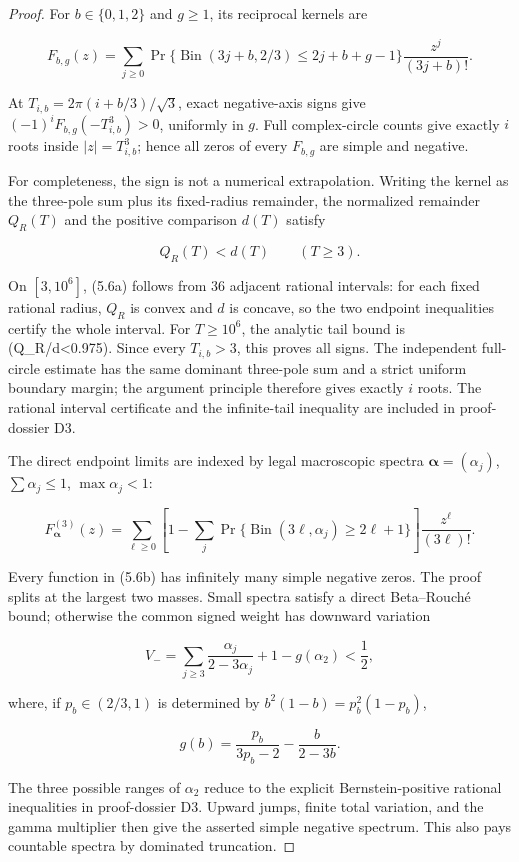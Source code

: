 \documentclass[10pt]{article}
\begin{document}
\begin{proof}


For $b\in\{0,1,2\}$ and $g\ge1$, its reciprocal kernels are

\[
 F_{b,g}(z)=\sum_{j\ge0}
 \Pr\{\operatorname{Bin}(3j+b,2/3)\le2j+b+g-1\}
 \frac{z^j}{(3j+b)!}. \tag{5.6}
\]

At
$T_{i,b}=2\pi(i+b/3)/\sqrt3$, exact negative-axis signs give
$(-1)^iF_{b,g}(-T_{i,b}^3)>0$, uniformly in $g$.  Full complex-circle
counts give exactly $i$ roots inside $|z|=T_{i,b}^3$; hence all zeros of
every $F_{b,g}$ are simple and negative.

For completeness, the sign is not a numerical extrapolation.  Writing the
kernel as the three-pole sum plus its fixed-radius remainder, the normalized
remainder $Q_R(T)$ and the positive comparison $d(T)$ satisfy

\[
 Q_R(T)<d(T)\qquad(T\ge3). \tag{5.6a}
\]

On $[3,10^6]$, (5.6a) follows from 36 adjacent rational intervals: for
each fixed rational radius, $Q_R$ is convex and $d$ is concave, so the two
endpoint inequalities certify the whole interval.  For $T\ge10^6$, the
analytic tail bound is (Q\_R/d<0.975).  Since every $T_{i,b}>3$, this proves
all signs.  The independent full-circle estimate has the same dominant
three-pole sum and a strict uniform boundary margin; the argument principle
therefore gives exactly $i$ roots.  The rational interval certificate and
the infinite-tail inequality are included in proof-dossier D3.

The direct endpoint limits are indexed by legal macroscopic spectra
$\boldsymbol\alpha=(\alpha_j)$, $\sum\alpha_j\le1$, $\max\alpha_j<1$:

\[
 F_{\boldsymbol\alpha}^{(3)}(z)=
 \sum_{\ell\ge0}\left[1-
 \sum_j\Pr\{\operatorname{Bin}(3\ell,\alpha_j)\ge2\ell+1\}\right]
 \frac{z^\ell}{(3\ell)!}. \tag{5.6b}
\]

Every function in (5.6b) has infinitely many simple negative zeros.  The proof
splits at the largest two masses.  Small spectra satisfy a direct Beta--Rouché
bound; otherwise the common signed weight has downward variation

\[
 V_-=\sum_{j\ge3}\frac{\alpha_j}{2-3\alpha_j}+1-g(\alpha_2)<\frac12, \tag{5.6c}
\]

where, if $p_b\in(2/3,1)$ is determined by
$b^2(1-b)=p_b^2(1-p_b)$,

\[
 g(b)=\frac{p_b}{3p_b-2}-\frac{b}{2-3b}. \tag{5.6c'}
\]

The three possible ranges of $\alpha_2$ reduce to the explicit
Bernstein-positive rational inequalities in proof-dossier D3.  Upward jumps,
finite total variation, and the gamma multiplier then give the asserted simple
negative spectrum.  This also pays countable spectra by dominated truncation.


\end{proof}
\end{document}

